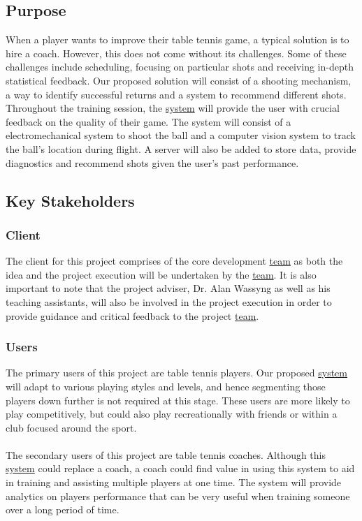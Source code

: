 \documentclass[11pt]{article}
\begin{document}
\subsection{Purpose}
When a player wants to improve their table tennis game, a typical solution is to hire a coach. However, this does not come without its challenges. Some of these challenges include scheduling, focusing on particular shots and receiving in-depth statistical feedback. Our proposed solution will consist of a shooting mechanism, a way to identify successful returns and a system to recommend different shots. Throughout the training session, the \hyperref[sec:definitions]{system} will provide the user with crucial feedback on the quality of their game. The system will consist of a electromechanical system to shoot the ball and a computer vision system to track the ball's location during flight. A server will also be added to store data, provide diagnostics and recommend shots given the user's past performance.
\subsection{Key Stakeholders}
\subsubsection{Client}
The client for this project comprises of the core development \hyperref[sec:definitions]{team} as both the idea and the project execution will be undertaken by the \hyperref[sec:definitions]{team}. It is also important to note that the project adviser, Dr. Alan Wassyng as well as his teaching assistants, will also be involved in the project execution in order to provide guidance and critical feedback to the project \hyperref[sec:definitions]{team}.
\subsubsection{Users}
The primary users of this project are table tennis players. Our proposed \hyperref[sec:definitions]{system} will adapt to various playing styles and levels, and hence segmenting those players down further is not required at this stage. These users are more likely to play competitively, but could also play recreationally with friends or within a club focused around the sport. \\\\
The secondary users of this project are table tennis coaches. Although this \hyperref[sec:definitions]{system} could replace a coach, a coach could find value in using this system to aid in training and assisting multiple players at one time. The system will provide analytics on players performance that can be very useful when training someone over a long period of time.
\end{document}
